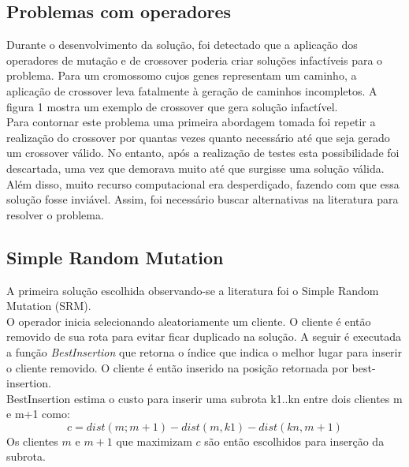 \documentclass[conference]{IEEEtran}
\begin{document}
\subsection{Problemas com operadores}
Durante o desenvolvimento da solução, foi detectado que a aplicação dos operadores de mutação e de crossover poderia criar soluções infactíveis para o problema. Para um cromossomo cujos genes representam um caminho, a aplicação de crossover leva fatalmente à geração de caminhos incompletos. A figura 1 mostra um exemplo de crossover que gera solução infactível. \\

Para contornar este problema uma primeira abordagem tomada foi repetir a realização do crossover por quantas vezes quanto necessário até que seja gerado um crossover válido. No entanto, após a realização de testes esta possibilidade foi descartada, uma vez que demorava muito até que surgisse uma solução válida. Além disso, muito recurso computacional era desperdiçado, fazendo com que essa solução fosse inviável. Assim, foi necessário buscar alternativas na literatura para resolver o problema.




\subsection{Simple Random Mutation}
A primeira solução escolhida observando-se a literatura foi o Simple Random Mutation (SRM).\\
O operador inicia selecionando aleatoriamente um cliente. O cliente é então removido de sua rota para evitar ficar duplicado na solução. A seguir é executada a função \textit{BestInsertion} que retorna o índice que indica o melhor lugar para inserir o cliente removido. O cliente é então inserido na posição retornada por best-insertion. \\

BestInsertion estima o custo para inserir uma subrota k1..kn entre dois clientes m e m+1 como: \[c = dist(m; m+1) - dist(m,k1) - dist(kn, m+1)\]
Os clientes $m$ e $m+1$ que maximizam $c$ são então escolhidos para inserção da subrota.\\
\end{document}
